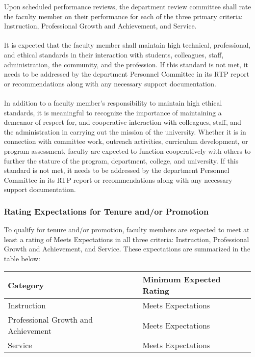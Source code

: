 \documentclass{scrartcl}
\begin{document}
Upon scheduled performance reviews, the department review committee shall rate the faculty member on their performance for each of the three primary criteria: Instruction, Professional Growth and Achievement, and Service.
\\\\
It is expected that the faculty member shall maintain high technical, professional, and ethical standards in their interaction with students, colleagues, staff, administration, the community, and the profession. If this standard is not met, it needs to be addressed by the department Personnel Committee in its RTP report or recommendations along with any necessary support documentation.
\\\\
In addition to a faculty member’s responsibility to maintain high ethical standards, it is meaningful to recognize the importance of maintaining a demeanor of respect for, and cooperative interaction with colleagues, staff, and the administration in carrying out the mission of the university. Whether it is in connection with committee work, outreach activities, curriculum development, or program assessment, faculty are expected to function cooperatively with others to further the stature of the program, department, college, and university. If this standard is not met, it needs to be addressed by the department Personnel Committee in its RTP report or recommendations along with any necessary support documentation.

\subsubsection{Rating Expectations for Tenure and/or Promotion}
To qualify for tenure and/or promotion, faculty members are expected to meet at least a rating of Meets Expectations in all three criteria: Instruction, Professional Growth and Achievement, and Service. These expectations are summarized in the table below:

\begin{longtable}{p{7cm}p{7cm}}

\hline
\textbf{Category} & \textbf{Minimum Expected Rating} \\
\hline
\endhead %
Instruction 	& Meets Expectations \\ \hline
Professional Growth and Achievement 	& Meets Expectations \\ \hline
Service 	& Meets Expectations \\ \hline
\end{longtable}
\end{document}
